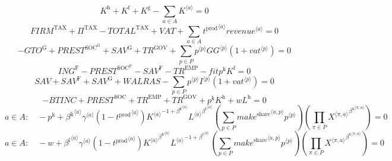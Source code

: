 \begin{equation}
K^{\mathrm{h}} + K^{\mathrm{f}} + K^{\mathrm{g}} - \sum_{a\in A} {K}^{\langle a\rangle} = 0
\end{equation}
\begin{equation}
{F\!I\!R\!M}^{\mathrm{TAX}} + \Pi^{\mathrm{TAX}} - {T\!O\!T\!A\!L}^{\mathrm{TAX}} + {V\!A\!T} + \sum_{a\in A} {{t^{\mathrm{prod}}}^{\langle a\rangle}} {{{r\!e\!v\!e\!n\!u\!e}}^{\langle a\rangle}} = 0
\end{equation}
\begin{equation}
-{G\!T\!O}^{\mathrm{G}} + {P\!R\!E\!S\!T}^{\mathrm{SOC}^{\mathrm{G}}} + {S\!A\!V}^{\mathrm{G}} + {T\!R}^{\mathrm{GOV}} + \sum_{p\in P} {{p}^{\langle p\rangle}} {{{G\!G}}^{\langle p\rangle}} \left(1 + {{v\!a\!t}}^{\langle p\rangle}\right) = 0
\end{equation}
\begin{equation}
{I\!N\!G}^{\mathrm{F}} - {P\!R\!E\!S\!T}^{\mathrm{SOC}^{\mathrm{F}}} - {S\!A\!V}^{\mathrm{F}} - {T\!R}^{\mathrm{EMP}} - {{f\!i\!t}} {p^{\mathrm{k}}} {K^{\mathrm{f}}} = 0
\end{equation}
\begin{equation}
{S\!A\!V} + {S\!A\!V}^{\mathrm{F}} + {S\!A\!V}^{\mathrm{G}} + {W\!A\!L\!R\!A\!S} - \sum_{p\in P} {{p}^{\langle p\rangle}} {{I}^{\langle p\rangle}} \left(1 + {{v\!a\!t}}^{\langle p\rangle}\right) = 0
\end{equation}
\begin{equation}
-{B\!T\!I\!N\!C} + {P\!R\!E\!S\!T}^{\mathrm{SOC}} + {T\!R}^{\mathrm{EMP}} + {T\!R}^{\mathrm{GOV}} + {p^{\mathrm{k}}} {K^{\mathrm{h}}} + {w} {L^{\mathrm{h}}} = 0
\end{equation}
\begin{equation}
a\in A\colon\quad -p^{\mathrm{k}} + {{\beta^{\mathrm{k}}}^{\langle a\rangle}} {{\gamma}^{\langle a\rangle}} \left(1 - {t^{\mathrm{prod}}}^{\langle a\rangle}\right) {{{K}^{\langle a\rangle}}^{-1 + {\beta^{\mathrm{k}}}^{\langle a\rangle}}} {{{L}^{\langle a\rangle}}^{{\beta^{\mathrm{l}}}^{\langle a\rangle}}} \left(\sum_{p\in P} {{{m\!a\!k\!e}^{\mathrm{share}}}^{\langle a,p\rangle}} {{p}^{\langle p\rangle}}\right) \left(\prod_{\pi\in P} {{X}^{\langle \pi,a\rangle}}^{{\beta^{\mathrm{x}}}^{\langle \pi,a\rangle}}\right) = 0
\end{equation}
\begin{equation}
a\in A\colon\quad -w + {{\beta^{\mathrm{l}}}^{\langle a\rangle}} {{\gamma}^{\langle a\rangle}} \left(1 - {t^{\mathrm{prod}}}^{\langle a\rangle}\right) {{{K}^{\langle a\rangle}}^{{\beta^{\mathrm{k}}}^{\langle a\rangle}}} {{{L}^{\langle a\rangle}}^{-1 + {\beta^{\mathrm{l}}}^{\langle a\rangle}}} \left(\sum_{p\in P} {{{m\!a\!k\!e}^{\mathrm{share}}}^{\langle a,p\rangle}} {{p}^{\langle p\rangle}}\right) \left(\prod_{\pi\in P} {{X}^{\langle \pi,a\rangle}}^{{\beta^{\mathrm{x}}}^{\langle \pi,a\rangle}}\right) = 0
\end{equation}
